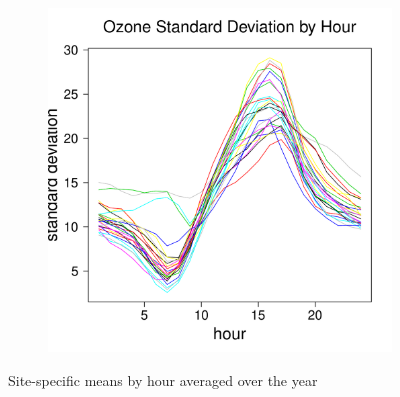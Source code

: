 \documentclass[alpha-refs]{wiley-article}
\begin{document}
\begin{figure}[H]
\begin{center}
\begin{subfigure}[b]{.3\textwidth}
            \label{fig:day_mean_ozone}
         \end{subfigure}
      \begin{subfigure}[b]{.3\textwidth}
      \includegraphics[width=\textwidth]{hour_sd_O3.pdf}
      \label{fig:hour_sd_ozone}
   \end{subfigure}
  \end{center}
  \vspace{-5mm}
       \caption{Site-specific means by hour averaged over the year}\label{fig:hour_mean}
\end{figure}
\vspace{-5mm}
\end{document}
